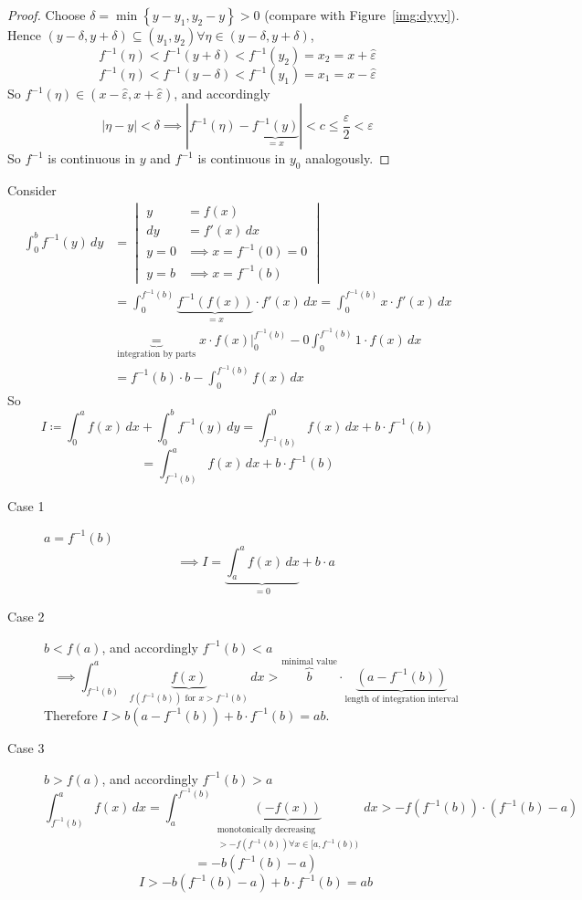 \documentclass{article}
\newcommand{\set}[1]{\left\{#1\right\}}
\newcommand{\card}[1]{\left|#1\right|}
\begin{document}
\begin{proof}
  Choose $\delta = \min\set{y - y_1, y_2 - y} > 0$ (compare with Figure~\ref{img:dyyy}).
  Hence $(y - \delta, y + \delta) \subseteq (y_1, y_2) \forall \eta \in (y - \delta, y + \delta)$,
  \[ f^{-1}(\eta) < f^{-1}(y + \delta) < f^{-1}(y_2) = x_2 = x + \hat\varepsilon \]
  \[ f^{-1}(\eta) < f^{-1}(y - \delta) < f^{-1}(y_1) = x_1 = x - \hat\varepsilon \]
  So $f^{-1}(\eta) \in (x - \hat{\varepsilon}, x + \hat{\varepsilon})$, and accordingly
  \[ \card{\eta - y} < \delta \implies \card{f^{-1}(\eta) - \underbrace{f^{-1}(y)}_{=x}} < c \leq \frac{\varepsilon}{2} < \varepsilon \]
  So $f^{-1}$ is continuous in $y$ and $f^{-1}$ is continuous in $y_0$ analogously.
\end{proof}

Consider
\begin{align*}
  \int_0^b f^{-1}(y) \, dy
    &= \begin{vmatrix}
      y &= f(x) \\
      dy &= f'(x) \, dx \\
      y = 0 &\implies x = f^{-1}(0) = 0 \\
      y = b &\implies x = f^{-1}(b)
    \end{vmatrix} \\
    &= \int_0^{f^{-1}(b)} \underbrace{f^{-1}(f(x))}_{=x} \cdot f'(x) \, dx = \int_0^{f^{-1}(b)} x \cdot f'(x) \, dx \\
    &\underbrace{=}_{\text{integration by parts}} \left. x \cdot f(x) \right|_0^{f^{-1}(b)} - 0 \int_0^{f^{-1}(b)} 1 \cdot f(x) \, dx \\
    &= f^{-1}(b) \cdot b - \int_0^{f^{-1}(b)} f(x) \, dx
\end{align*}
So
\[
  I \coloneqq \int_0^a f(x) \, dx + \int_0^b f^{-1}(y) \, dy = \int_{f^{-1}(b)}^0 f(x) \, dx + b \cdot f^{-1}(b)
\] \[
  = \int_{f^{-1}(b)}^a f(x) \, dx + b \cdot f^{-1}(b)
\]

\begin{description}
  \item[Case 1] $a = f^{-1}(b)$
    \[ \implies I = \underbrace{\int_a^a f(x) \, dx}_{=0} + b \cdot a \]
  \item[Case 2] $b < f(a)$, and accordingly $f^{-1}(b) < a$
    \[ \implies \int_{f^{-1}(b)}^a \underbrace{f(x)}_{f(f^{-1}(b)) \text{ for } x > f^{-1}(b)} \, dx > \overbrace{b}^{\text{minimal value}} \cdot \underbrace{(a - f^{-1}(b))}_{\text{length of integration interval}}  \]
    Therefore $I > b(a - f^{-1}(b)) + b \cdot f^{-1}(b) = ab$.
  \item[Case 3] $b > f(a)$, and accordingly $f^{-1}(b) > a$
    \[ \int_{f^{-1}(b)}^a f(x) \, dx = \int_a^{f^{-1}(b)} \underbrace{(-f(x))}_{\substack{\text{monotonically decreasing} \\ > -f(f^{-1}(b)) \forall x \in [a,f^{-1}(b))}} \, dx > -f(f^{-1}(b)) \cdot (f^{-1}(b) - a) \]
    \[ = -b(f^{-1}(b) - a) \]
    \[ I > -b (f^{-1}(b) - a) + b \cdot f^{-1}(b) = ab \]
\end{description}
\end{document}
